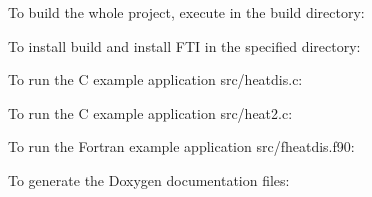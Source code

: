 To build the whole project, execute in the build directory\+: ~\newline



\begin{DoxyCode}{0}
\end{DoxyCode}


To install build and install F\+TI in the specified directory\+: ~\newline



\begin{DoxyCode}{0}
\end{DoxyCode}


To run the C example application {\ttfamily src/heatdis.\+c}\+:


\begin{DoxyCode}{0}
\end{DoxyCode}


To run the C example application {\ttfamily src/heat2.\+c}\+:


\begin{DoxyCode}{0}
\end{DoxyCode}


To run the Fortran example application {\ttfamily src/fheatdis.\+f90}\+:


\begin{DoxyCode}{0}
\end{DoxyCode}


To generate the Doxygen documentation files\+:


\begin{DoxyCode}{0}
\end{DoxyCode}
 
